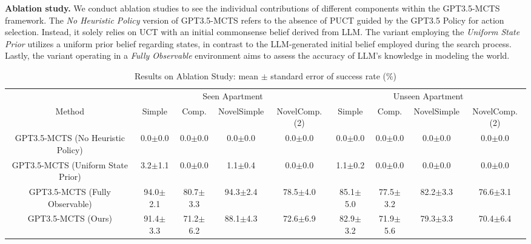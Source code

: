 \textbf{Ablation study.}
We conduct ablation studies to see the individual contributions of different components within the GPT3.5-MCTS framework. The \textit{No Heuristic Policy} version of GPT3.5-MCTS refers to the absence of PUCT guided by the GPT3.5 Policy for action selection. Instead, it solely relies on UCT with an initial commonsense belief derived from LLM. The variant employing the \textit{Uniform State Prior} utilizes a uniform prior belief regarding states, in contrast to the LLM-generated initial belief employed during the search process. Lastly, the variant operating in a \textit{Fully Observable} environment aims to assess the accuracy of LLM's knowledge in modeling the world.

\begin{table}[h]
\vspace{-5pt}
\setlength\extrarowheight{-3pt}
\setlength\tabcolsep{2pt}
\centering\scriptsize
\caption{Results on Ablation Study:  mean $\pm$ standard error of success rate (\%)}
\vspace{-7pt}
\begin{tabular}{@{}ccccccccc@{}}
\toprule
                  & \multicolumn{4}{c}{Seen Apartment}       & \multicolumn{4}{c}{Unseen Apartment}                      \\ \cmidrule(l){2-5} \cmidrule(l){6-9}
Method            &  Simple &  Comp. & NovelSimple & NovelComp.(2)  &  Simple &  Comp. & NovelSimple & NovelComp.(2)\\ \midrule
GPT3.5-MCTS (No Heuristic Policy)  &  0.0$\pm$0.0   &   0.0$\pm$0.0       &  0.0$\pm$0.0    &    0.0$\pm$0.0    &  0.0$\pm$0.0    &   0.0$\pm$0.0       &  0.0$\pm$0.0     &    0.0$\pm$0.0              \\
GPT3.5-MCTS (Uniform State Prior)  &   3.2$\pm$1.1     &  0.0$\pm$0.0     &  1.1$\pm$0.4       &     0.0$\pm$0.0     &   1.1$\pm$0.2     &  0.0$\pm$0.0      &  0.0$\pm$0.0       &     0.0$\pm$0.0             \\
GPT3.5-MCTS (Fully Observable) &   94.0$\pm$2.1    &   80.7$\pm$3.3     &  94.3$\pm$2.4       &     78.5$\pm$4.0       &   85.1$\pm$5.0     &  77.5$\pm$3.2      &  82.2$\pm$3.3       &     76.6$\pm$3.1            \\
GPT3.5-MCTS (Ours)      & 91.4$\pm$3.3   &  71.2$\pm$6.2    &  88.1$\pm$4.3   &  72.6$\pm$6.9    &  82.9$\pm$3.2   &  71.9$\pm$5.6    &  79.3$\pm$3.3   &   70.4$\pm$6.4        

\end{tabular}
\end{table}
